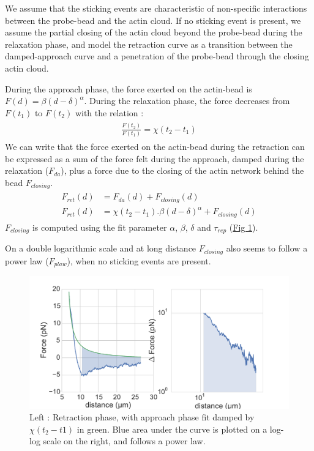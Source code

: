 \documentclass[A4paperpaper,11pt,english]{sphinxmanual}
\begin{document}
We assume that the sticking events are characteristic of non-specific interactions
between the probe-bead and the actin cloud. If no sticking event
is present, we assume the partial closing of the actin cloud beyond the
probe-bead during the relaxation phase, and model the retraction curve as a
transition between the damped-approach curve and a penetration of the probe-bead through the closing actin cloud.

During the approach phase, the force exerted on the actin-bead is
\(F(d)=\beta(d-\delta)^\alpha\). During the relaxation phase, the force
decreases from \(F(t_1)\) to \(F(t_2)\) with the relation :
\label{index-latex:equation-eqa311}\begin{gather}
\begin{split}\frac{F(t_2)}{F(t_1)} = \chi(t_2-t_1)\end{split}\label{index-latex-eqa311}
\end{gather}
We can write that the force exerted on the actin-bead during the retraction  can be expressed as a sum of the force felt during the approach, damped during the
relaxation (\(F_{da}\)), plus a force due to the closing of the actin
network behind the bead \(F_{closing}\).
\label{index-latex:equation-eqa312}\begin{gather}
\begin{split}F_{ret}(d) &= F_{da}(d) + F_{closing}(d)\\
F_{ret}(d) &= \chi(t_2-t_1).\beta(d-\delta)^\alpha+ F_{closing}(d)\end{split}\label{index-latex-eqa312}
\end{gather}
\(F_{closing}\) is computed using the fit parameter \(\alpha\), \(\beta\), \(\delta\) and \(\tau_{rep}\) (\hyperref[index-latex:retract-powerlaw]{Fig  \ref*{index-latex:retract-powerlaw}}).

On a double logarithmic scale and at long distance \(F_{closing}\) also seems to
follow a power law (\(F_{plaw}\)), when no sticking events are present.
\begin{figure}[htbp]
\centering
\capstart

\includegraphics[width=1.000\linewidth]{retract-powerlaw.pdf}
\caption{Left : Retraction phase, with approach phase fit damped by
\(\chi(t_2-t1)\) in green. Blue area under the curve is plotted on a
log-log scale on the right, and follows a power law.}\label{index-latex:retract-powerlaw}\end{figure}
\end{document}
